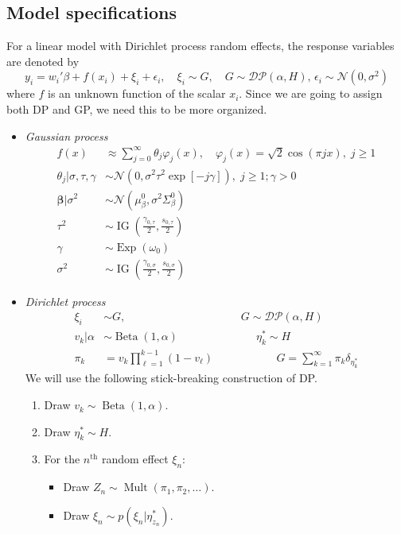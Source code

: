 \documentclass[11pt]{article}
\newcommand{\bs}{\boldsymbol}
\newcommand{\opn}{\operatorname}
\begin{document}
\subsection{Model specifications}
For a linear model with Dirichlet process random effects, the response variables are denoted by
$$
  y_{i} = w_{i}'\beta + f\left(x_{i}\right) + \xi_{i}+\epsilon_{i}, \quad \xi_{i} \sim G, \quad G \sim \mathcal{DP}\left(\alpha, H\right),\, \epsilon_{i} \sim \mathcal{N}\left(0, \sigma^{2}\right)
$$
where $f$ is an unknown function of the scalar $x_{i}$. Since we are going to assign both DP and GP, we need this to be more organized.
\begin{itemize}
\item \emph{Gaussian process} \begin{align*}
  f\left(x\right) &\approx \sum_{j=0}^{\infty}\theta_{j}\varphi_{j}\left(x\right), \quad \varphi_{j}\left(x\right) = \sqrt{2}\cos \left(\pi jx\right),\; j\ge 1\\
  \theta_{j}|\sigma, \tau, \gamma &\sim \mathcal{N}\left(0, \sigma^{2}\tau^{2}\exp \left[-j\gamma\right]\right),\; j \ge 1; \gamma>0\\
  \bs{\beta}|\sigma^{2} &\sim \mathcal{N}\left(\mu_{\beta}^{0}, \sigma^{2}\Sigma_{\beta}^{0} \right)\\
  \tau^{2} &\sim \opn{IG}\left(\frac{\gamma_{0,\tau}}{2}, \frac{s_{0,\tau}}{2}\right)\\
  \gamma &\sim \opn{Exp}\left(\omega_{0}\right)\\
  \sigma^{2} &\sim \opn{IG}\left(\frac{\gamma_{0,\sigma}}{2}, \frac{s_{0,\sigma}}{2}\right)
\end{align*}
\item \emph{Dirichlet process} \begin{align*}
  \xi_{i} &\sim G, \qquad\qquad\qquad\qquad\qquad\,\, G \sim \mathcal{DP}\left(\alpha, H\right)\\
  v_{k}|\alpha &\sim \opn{Beta}\left(1, \alpha \right) \quad \quad \quad \quad\quad \quad\quad \eta_{k}^{*} \sim H \\
   \pi_{k} &= v_{k}\prod_{\ell=1}^{k-1}\left(1-v_{\ell} \right) \quad \quad \quad \quad\quad  \,\,\,\,  G = \sum_{k=1}^{\infty} \pi_{k}\delta_{\eta_{k}^{*}}
\end{align*}
We will use the following stick-breaking construction of DP.
\begin{enumerate}
  \item Draw $v_{k} \sim \opn{Beta}\left(1, \alpha \right)$.
  \item Draw $\eta_{k}^{*} \sim H$.
  \item For the $n^{\text{th}}$ random effect $\xi_{n}$:
    \begin{itemize}
      \item Draw $Z_{n} \sim \opn{Mult}\left(\pi_{1}, \pi_{2}, \ldots \right)$.
      \item Draw $\xi_{n} \sim p\left(\xi_{n}|\eta_{z_{n}}^{*} \right) $.
    \end{itemize}
\end{enumerate}

\end{itemize}
\end{document}
